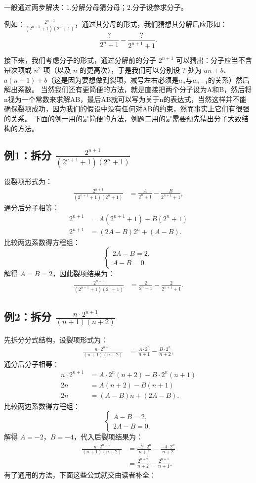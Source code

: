 \documentclass{article}
\begin{document}
一般通过两步解决：1.分解分母猜分母；2.分子设参求分子。

例如：\(\displaystyle \frac{2^{n+1}}{(2^{n+1}+1)(2^n+1)}\)，通过其分母的形式，我们猜想其分解后应形如：
\[
\frac{?}{2^n+1} - \frac{?}{2^{n+1}+1}.
\]

接下来，我们考虑分子的形式，通过分解前的分子 \(2^{n+1}\) 可以猜出：分子应当不含幂次项或 \(n^2\) 项（以及 \(n\) 的更高次），于是我们可以分别设 \(?\) 处为 \(an+b\)、\(a(n+1)+b\)（这是因为要想做到裂项，减号左右必须是$a_n$与$a_{n-1}$的关系）然后解出系数。
当然我们还有更简便的方法，就是直接把两个分子设为A和B，然后将n视为一个常数来求解AB，最后AB就可以写为关于n的表达式，当然这样并不能确保裂项成功，因为我们的假设中没有任何对AB的约束，然而事实上它们有很强的关系。
下面的例一用的是简便的方法，例题二用的是需要预先猜出分子大致结构的方法。


\subsection*{例1：拆分 \(\displaystyle \frac{2^{n+1}}{(2^{n+1}+1)(2^n+1)}\)}
设裂项形式为：
\begin{align*}
\frac{2^{n+1}}{(2^{n+1}+1)(2^n+1)} &= \frac{A}{2^n+1} - \frac{B}{2^{n+1}+1},
\end{align*}
通分后分子相等：
\begin{align*}
2^{n+1} &= A(2^{n+1}+1) - B(2^n+1) \\
2^{n+1} &= (2A - B)2^n + (A - B).
\end{align*}
比较两边系数得方程组：
\[
\begin{cases}
2A - B = 2, \\
A - B = 0.
\end{cases}
\]
解得 \(A = B = 2\)，因此裂项结果为：
\begin{align*}
\frac{2^{n+1}}{(2^{n+1}+1)(2^n+1)} &= \frac{2}{2^n+1} - \frac{2}{2^{n+1}+1}.
\end{align*}

\subsection*{例2：拆分 \(\displaystyle \frac{n\cdot 2^{n+1}}{(n+1)(n+2)}\)}
先拆分分式结构，设裂项形式为：
\begin{align*}
\frac{n\cdot 2^{n+1}}{(n+1)(n+2)} &= \frac{A\cdot 2^n}{n+1} - \frac{B\cdot 2^n}{n+2},
\end{align*}
通分后分子相等：
\begin{align*}
n\cdot 2^{n+1} &= A\cdot 2^n (n+2) - B\cdot 2^n (n+1) \\
2n &= A(n+2) - B(n+1) \\
2n &= (A - B)n + (2A - B).
\end{align*}
比较两边系数得方程组：
\[
\begin{cases}
A - B = 2, \\
2A - B = 0.
\end{cases}
\]
解得 \(A = -2\)，\(B = -4\)，代入后裂项结果为：
\begin{align*}
\frac{n\cdot 2^{n+1}}{(n+1)(n+2)} &= \frac{-2\cdot 2^n}{n+1} - \frac{-4\cdot 2^n}{n+2} \\
&= \frac{2^{n+2}}{n+2} - \frac{2^{n+1}}{n+1}.
\end{align*}
有了通用的方法，下面这些公式就交由读者补全：
\end{document}
